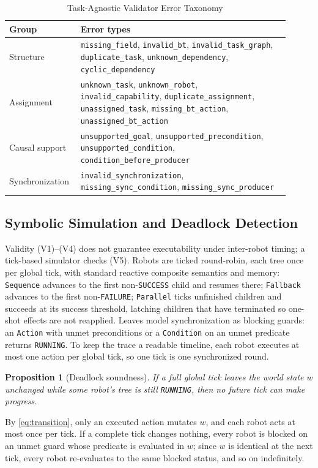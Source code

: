 \documentclass[journal]{IEEEtran}
\newtheorem{proposition}{Proposition}
\newcommand{\pred}[1]{\texttt{#1}}
\begin{document}
\begin{table}[!t]
\renewcommand{\arraystretch}{1.2}
\caption{Task-Agnostic Validator Error Taxonomy}
\label{tab:errors}
\centering
\footnotesize
\begin{tabular}{p{0.20\linewidth} p{0.71\linewidth}}
\toprule
Group & Error types \\
\midrule
Structure & \texttt{missing\_field}, \texttt{invalid\_bt}, \texttt{invalid\_task\_graph}, \texttt{duplicate\_task}, \texttt{unknown\_dependency}, \texttt{cyclic\_dependency} \\
Assignment & \texttt{unknown\_task}, \texttt{unknown\_robot}, \texttt{invalid\_capability}, \texttt{duplicate\_assignment}, \texttt{unassigned\_task}, \texttt{missing\_bt\_action}, \texttt{unassigned\_bt\_action} \\
Causal support & \texttt{unsupported\_goal}, \texttt{unsupported\_precondition}, \texttt{unsupported\_condition}, \texttt{condition\_before\_producer} \\
Synchronization & \texttt{invalid\_synchronization}, \texttt{missing\_sync\_condition}, \texttt{missing\_sync\_producer} \\
\bottomrule
\end{tabular}
\end{table}

\subsection{Symbolic Simulation and Deadlock Detection}
\label{sec:sim}
Validity (V1)--(V4) does not guarantee executability under inter-robot timing; a tick-based simulator checks (V5). Robots are ticked round-robin, each tree once per global tick, with standard reactive composite semantics and memory: \pred{Sequence} advances to the first non-\pred{SUCCESS} child and resumes there; \pred{Fallback} advances to the first non-\pred{FAILURE}; \pred{Parallel} ticks unfinished children and succeeds at its success threshold, latching children that have terminated so one-shot effects are not reapplied. Leaves model synchronization as blocking guards: an \pred{Action} with unmet preconditions or a \pred{Condition} on an unmet predicate returns \pred{RUNNING}. To keep the trace a readable timeline, each robot executes at most one action per global tick, so one tick is one synchronized round.

\begin{proposition}[Deadlock soundness]
If a full global tick leaves the world state $w$ unchanged while some robot's tree is still \pred{RUNNING}, then no future tick can make progress.
\end{proposition}
\begin{IEEEproof}[Justification]
By \eqref{eq:transition}, only an executed action mutates $w$, and each robot acts at most once per tick. If a complete tick changes nothing, every robot is blocked on an unmet guard whose predicate is evaluated in $w$; since $w$ is identical at the next tick, every robot re-evaluates to the same blocked status, and so on indefinitely.
\end{IEEEproof}
\end{document}

